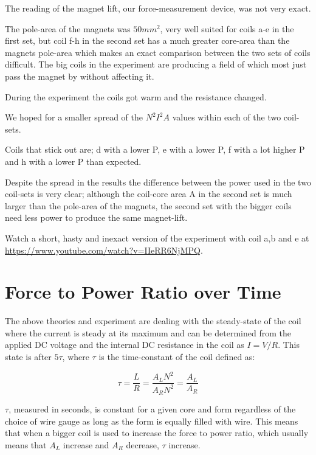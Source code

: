 \documentclass[]{elementary-physics}
\begin{document}
The reading of the magnet lift, our force-measurement device, was not very exact.

The pole-area of the magnets was $50 mm^2$, very well suited for coils a-e in the first set, but coil f-h in the second set has a much greater core-area than the magnets pole-area which makes an exact comparison between the two sets of coils difficult. 
The big coils in the experiment are producing a field of which most just pass the magnet by without affecting it.

During the experiment the coils got warm and the resistance changed.

We hoped for a smaller spread of the $N^2 I^2 A$ values within each of the two coil-sets.

Coils that stick out are; d with a lower P, e with a lower P, f with a lot higher P and h with a lower P than expected.

Despite the spread in the results the difference between the power used in the two coil-sets is very clear; although the coil-core area A in the second set is much larger than the pole-area of the magnets, the second set with the bigger coils need less power to produce the same magnet-lift.

Watch a short, hasty and inexact version of the experiment with coil a,b and e at \url{https://www.youtube.com/watch?v=IIeRR6NjMPQ}.

\section{Force to Power Ratio over Time}

The above theories and experiment are dealing with the steady-state of the coil where the current is steady at its maximum and can be determined from the applied DC voltage and the internal DC resistance in the coil as $I = V/R$. 
This state is after $5 \tau$, where $\tau$ is the time-constant of the coil defined as:

\begin{equation}
\tau = \frac{L}{R} = \frac{A_L N^2}{A_R N^2} = \frac{A_L}{A_R}
\end{equation}

$\tau$, measured in seconds, is constant for a given core and form regardless of the choice of wire gauge as long as the form is equally filled with wire.
This means that when a bigger coil is used to increase the force to power ratio, which usually means that $A_L$ increase and $A_R$ decrease, $\tau$ increase.
\end{document}
